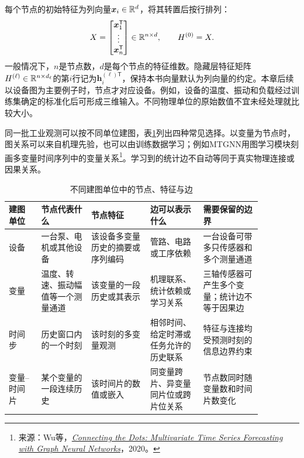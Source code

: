 每个节点的初始特征为列向量$\bm x_i\in\mathbb{R}^d$，将其转置后按行排列：
\begin{equation}
 X=\begin{bmatrix}\bm x_1^{\mathsf T}\\\vdots\\\bm x_n^{\mathsf T}\end{bmatrix}\in\mathbb{R}^{n\times d},\qquad H^{(0)}=X.
 \label{eq:graph-feature-matrix}
\end{equation}
一般情况下，$n$是节点数，$d$是每个节点的特征维数。隐藏层特征矩阵$H^{(\ell)}\in\mathbb{R}^{n\times d_\ell}$的第$i$行记为$\bm h_i^{(\ell)\mathsf T}$，保持本书向量默认为列向量的约定。本章后续以设备图为主要例子时，节点才对应设备。例如，设备的温度、振动和负载经过训练集确定的标准化后可形成三维输入。不同物理单位的原始数值不宜未经处理就比较大小。

同一批工业观测可以按不同单位建图，表\ref{tab:graph-node-units}列出四种常见选择。以变量为节点时，图关系可以来自机理先验，也可以由训练数据学习；例如MTGNN用图学习模块刻画多变量时间序列中的变量关系\footnote{来源：Wu等，\href{https://arxiv.org/abs/2005.11650}{\textit{Connecting the Dots: Multivariate Time Series Forecasting with Graph Neural Networks}}，2020。}。学习到的统计边不自动等同于真实物理连接或因果关系。

\begin{table}[htbp]
\centering
\caption{不同建图单位中的节点、特征与边}
\label{tab:graph-node-units}
\footnotesize
\setlength{\tabcolsep}{2.5pt}
\renewcommand{\arraystretch}{1.18}
\begin{tabular}{@{}>{\raggedright\arraybackslash}m{0.11\linewidth}>{\raggedright\arraybackslash}m{0.17\linewidth}>{\raggedright\arraybackslash}m{0.20\linewidth}>{\raggedright\arraybackslash}m{0.18\linewidth}>{\raggedright\arraybackslash}m{0.20\linewidth}@{}}
\toprule
建图单位 & 节点代表什么 & 节点特征 & 边可以表示什么 & 需要保留的边界 \\
\midrule
设备 & 一台泵、电机或其他设备 & 该设备多变量历史的摘要或序列编码 & 管路、电路或工序依赖 & 一台设备可带多只传感器和多个测量通道 \\
变量 & 温度、转速、振动幅值等一个测量通道 & 该变量的一段历史或其表示 & 机理联系、统计依赖或学习关系 & 三轴传感器可产生多个变量；统计边不等于因果边 \\
时间步 & 历史窗口内的一个时刻 & 该时刻的多变量观测 & 相邻时间、给定时滞或任务允许的历史联系 & 特征与连接均受预测时刻的信息边界约束 \\
变量--时间片 & 某个变量的一段连续历史 & 该时间片的数值或嵌入 & 同变量跨片、异变量同片位或跨片位关系 & 节点数同时随变量数和时间片数变化 \\
\bottomrule
\end{tabular}
\end{table}

